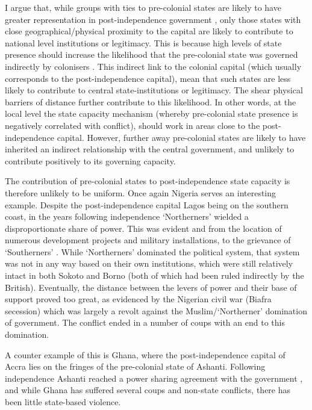 \documentclass[12pt]{article}
\begin{document}
I argue that, while groups with ties to pre-colonial states are likely to have
greater representation in post-independence government \citep{Paine2019}, only
those states with close geographical/physical proximity to the capital are
likely to contribute to national level institutions or legitimacy. This is
because high levels of state presence should increase the likelihood that the
pre-colonial state was governed indirectly by colonisers \citep{Hariri2012}.
This indirect link to the colonial capital (which usually corresponds to the
post-independence capital), mean that such states are less likely to contribute
to central state-institutions or legitimacy. The shear physical barriers of
distance further contribute to this likelihood. In other words, at the local
level the state capacity mechanism (whereby pre-colonial state presence is
negatively correlated with conflict), should work in areas close to the
post-independence capital. However, further away pre-colonial states are likely
to have inherited an indirect relationship with the central government, and
unlikely to contribute positively to its governing capacity.

The contribution of pre-colonial states to post-independence state capacity is
therefore unlikely to be uniform. Once again Nigeria serves an interesting
example. Despite the post-independence capital Lagos being on the southern
coast, in the years following independence `Northerners' wielded a
disproportionate share of power. This was evident and from the location of
numerous development projects and military installations, to the grievance of
`Southerners' \citep{Bates2008a}. While `Northerners' dominated the political
system, that system was not in any way based on their own institutions, which
were still relatively intact in both Sokoto and Borno (both of which had been
ruled indirectly by the British). Eventually, the distance between the levers of
power and their base of support proved too great, as evidenced by the Nigerian
civil war (Biafra secession) which was largely a revolt against the
Muslim/`Northerner' domination of government. The conflict ended in a number of
coups with an end to this domination. 

A counter example of this is Ghana, where the post-independence capital of Accra
lies on the fringes of the pre-colonial state of Ashanti. Following independence
Ashanti reached a power sharing agreement with the government
\citep{Apter_1960}, and while Ghana has suffered several coups and non-state
conflicts, there has been little state-based violence.
\end{document}
